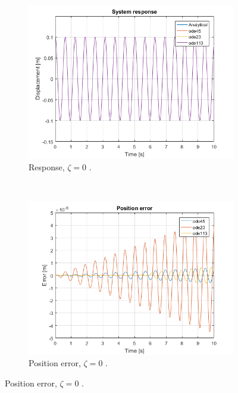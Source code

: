 \documentclass{article}
\begin{document}
	\clearpage
		\begin{figure}[h]
		\centering
		\begin{subfigure}[t]{0.41\textwidth}
			\includegraphics[width=\textwidth]{response_comparison_undamped.png}
			\caption{Response, $\zeta = 0$ .}
		\end{subfigure}
		~
		\begin{subfigure}[t]{0.41\textwidth}
			\includegraphics[width=\textwidth]{error_comparison_undamped.png}
			\caption{Position error, $\zeta = 0$ .}
		\end{subfigure}
		

\end{figure}
\end{document}
